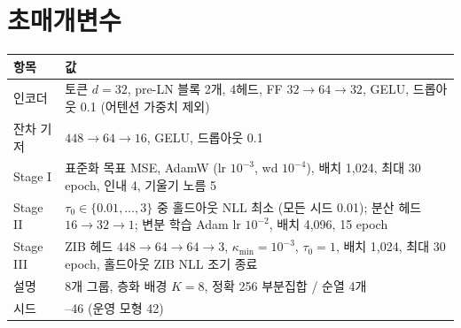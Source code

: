 \documentclass[journal,a4paper,10pt]{IEEEtran}
\begin{document}
\section{초매개변수}
\label{app:hparam}
\begin{center}
\footnotesize
\begin{tabular}{@{}>{\raggedright\arraybackslash}p{}>{\raggedright\arraybackslash}p{}@{}}
\toprule
항목 & 값 \\
\midrule
인코더 & 토큰 $d=32$, pre-LN 블록 2개, 4헤드, FF $32\to64\to32$, GELU, 드롭아웃 0.1 (어텐션 가중치 제외) \\
잔차 기저 & $448\to64\to16$, GELU, 드롭아웃 0.1 \\
Stage I & 표준화 목표 MSE, AdamW (lr $10^{-3}$, wd $10^{-4}$), 배치 1,024, 최대 30 epoch, 인내 4, 기울기 노름 5 \\
Stage II & $\tau_0\in\{0.01,\dots,3\}$ 중 홀드아웃 NLL 최소 (모든 시드 0.01); 분산 헤드 $16\to32\to1$; 변분 학습 Adam lr $10^{-2}$, 배치 4,096, 15 epoch \\
Stage III & ZIB 헤드 $448\to64\to64\to3$, $\kappa_{\min}=10^{-3}$, $\tau_0=1$, 배치 1,024, 최대 30 epoch, 홀드아웃 ZIB NLL 조기 종료 \\
설명 & 8개 그룹, 층화 배경 $K=8$, 정확 256 부분집합 / 순열 4개 \\
시드 & 42–46 (운영 모형 42) \\
\bottomrule
\end{tabular}
\end{center}
\end{document}
